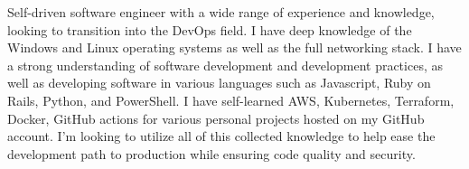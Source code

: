 %
%
%

\par{
	Self-driven software engineer with a wide range of experience and knowledge, looking to transition into the DevOps field.
	I have deep knowledge of the Windows and Linux operating systems as well as the full networking stack. I have a strong
	understanding of software development and development practices, as well as developing software in various languages such
	as Javascript, Ruby on Rails, Python, and PowerShell. I have self-learned AWS, Kubernetes, Terraform, Docker, GitHub actions
	for various personal projects hosted on my GitHub account. I'm looking to utilize all of this collected knowledge to help
	ease the development path to production while ensuring code quality and security.
}